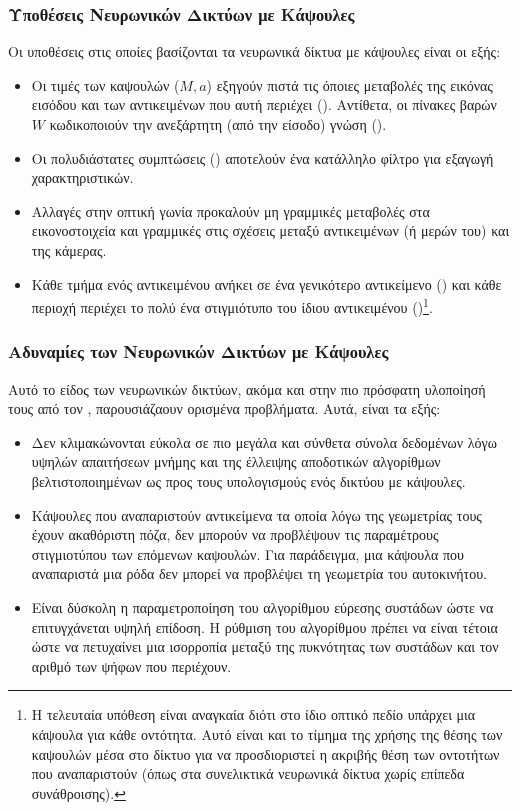 \subsubsection{Υποθέσεις Νευρωνικών Δικτύων με Κάψουλες}
\label{sec:core_assumptions}
Οι υποθέσεις στις οποίες βασίζονται τα νευρωνικά δίκτυα με κάψουλες είναι οι εξής:
\begin{itemize}
  \item Οι τιμές των καψουλών ($M,a$) εξηγούν πιστά τις όποιες μεταβολές της εικόνας εισόδου και των αντικειμένων που αυτή περιέχει (). Αντίθετα, οι πίνακες βαρών $W$ κωδικοποιούν την ανεξάρτητη (από την είσοδο) γνώση ().
  \item Οι πολυδιάστατες συμπτώσεις () αποτελούν ένα κατάλληλο φίλτρο για εξαγωγή χαρακτηριστικών.
  \item Αλλαγές στην οπτική γωνία προκαλούν μη γραμμικές μεταβολές στα εικονοστοιχεία και γραμμικές στις σχέσεις μεταξύ αντικειμένων (ή μερών του) και της κάμερας.
  \item Κάθε τμήμα ενός αντικειμένου ανήκει σε ένα γενικότερο αντικείμενο () και κάθε περιοχή περιέχει το πολύ ένα στιγμιότυπο του ίδιου αντικειμένου ()\footnote{Η τελευταία υπόθεση είναι αναγκαία διότι στο ίδιο οπτικό πεδίο υπάρχει μια κάψουλα για κάθε οντότητα. Αυτό είναι και το τίμημα της χρήσης της θέσης των καψουλών μέσα στο δίκτυο για να προσδιοριστεί η ακριβής θέση των οντοτήτων που αναπαριστούν (όπως στα συνελικτικά νευρωνικά δίκτυα χωρίς επίπεδα συνάθροισης).}.
\end{itemize}

\subsubsection{Αδυναμίες των Νευρωνικών Δικτύων με Κάψουλες}
Αυτό το είδος των νευρωνικών δικτύων, ακόμα και στην πιο πρόσφατη υλοποίησή τους από τον , παρουσιάζαουν ορισμένα προβλήματα. Αυτά, είναι τα εξής:
\begin{itemize}
  \item Δεν κλιμακώνονται εύκολα σε πιο μεγάλα και σύνθετα σύνολα δεδομένων λόγω υψηλών απαιτήσεων μνήμης και της έλλειψης αποδοτικών αλγορίθμων βελτιστοποιημένων ως προς τους υπολογισμούς ενός δικτύου με κάψουλες.
  \item Κάψουλες που αναπαριστούν αντικείμενα τα οποία λόγω της γεωμετρίας τους έχουν ακαθόριστη πόζα, δεν μπορούν να προβλέψουν τις παραμέτρους στιγμιοτύπου των επόμενων καψουλών. Για παράδειγμα, μια κάψουλα που αναπαριστά μια ρόδα δεν μπορεί να προβλέψει τη γεωμετρία του αυτοκινήτου.
  \item Είναι δύσκολη η παραμετροποίηση του αλγορίθμου εύρεσης συστάδων ώστε να επιτυγχάνεται υψηλή επίδοση. Η ρύθμιση του αλγορίθμου πρέπει να είναι τέτοια ώστε να πετυχαίνει μια ισορροπία μεταξύ της πυκνότητας των συστάδων και τον αριθμό των ψήφων που περιέχουν. 
\end{itemize}



